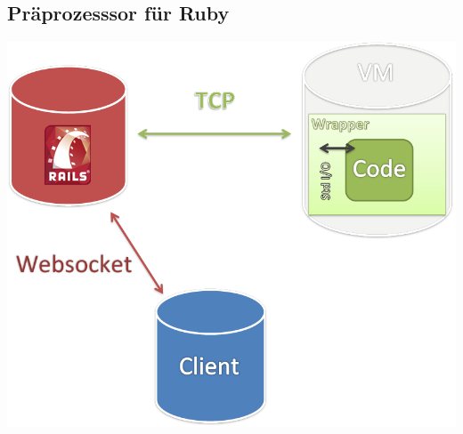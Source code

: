 \subsection{Präprozesssor für Ruby}

\begin{frame}
\begin{center}
	\includegraphics[scale=0.35]{overview}
\end{center}
\end{frame}

